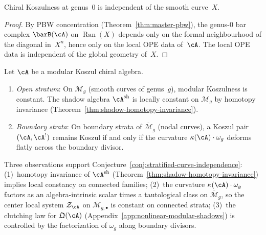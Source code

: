\begin{proposition}
\label{prop:genus0-curve-independence}
\ClaimStatusProvedHere
{}
Chiral Koszulness at genus~$0$ is independent of the
smooth curve~$X$.
\end{proposition}

\begin{proof}
By PBW concentration (Theorem~\ref{thm:master-pbw}),
the genus-$0$ bar complex $\barB(\cA)$ on
$\operatorname{Ran}(X)$ depends only on the formal
neighbourhood of the diagonal in~$X^n$, hence only on
the local OPE data of~$\cA$.  The local OPE data is
independent of the global geometry of~$X$.
\end{proof}

\begin{conjecture}
\label{conj:stratified-curve-independence}
\ClaimStatusConjectured
{}
Let $\cA$ be a modular Koszul chiral algebra.
\begin{enumerate}[label=\textup{(\roman*)}]
\item \emph{Open stratum}:
  On $\mathcal{M}_g$ (smooth curves of genus~$g$),
  modular Koszulness is constant.
  The shadow algebra $\cA^{\mathrm{sh}}$ is locally
  constant on $\mathcal{M}_g$ by homotopy invariance
  \textup{(}Theorem~\textup{\ref{thm:shadow-homotopy-invariance})}.
\item \emph{Boundary strata}:
  On boundary strata of $\overline{\mathcal{M}}_g$
  (nodal curves), a Koszul pair $(\cA, \cA^!)$ remains
  Koszul if and only if the curvature
  $\kappa(\cA) \cdot \omega_g$ deforms flatly across
  the boundary divisor.
\end{enumerate}
\end{conjecture}

\begin{remark}
\label{rem:curve-independence-evidence}
Three observations support
Conjecture~\textup{\ref{conj:stratified-curve-independence}}:
\textup{(1)}~homotopy invariance of
$\cA^{\mathrm{sh}}$
(Theorem~\ref{thm:shadow-homotopy-invariance})
implies local constancy on connected families;
\textup{(2)}~the curvature $\kappa(\cA) \cdot \omega_g$
factors as an algebra-intrinsic scalar times a
tautological class on $\overline{\mathcal{M}}_g$, so the
center local system $\mathcal{Z}_\cA$ on
$\overline{\mathcal{M}}_{g,\bullet}$ is constant on
connected strata;
\textup{(3)}~the clutching law for $\mathfrak{Q}(\cA)$
(Appendix~\ref{app:nonlinear-modular-shadows}) is
controlled by the factorization of $\omega_g$ along
boundary divisors.
\end{remark}

